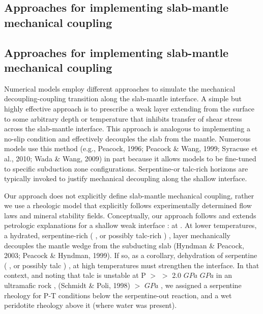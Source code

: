 \documentclass[draft,linenumbers]{agujournal2018} %
\providecommand{\DIFaddtex}[1]{{\protect\color{blue} \sf #1}} %
\providecommand{\DIFdeltex}[1]{{\protect\color{red} \scriptsize #1}} %
\providecommand{\DIFaddbegin}{} %
\providecommand{\DIFaddend}{} %
\providecommand{\DIFdelbegin}{} %
\providecommand{\DIFdelend}{} %
\providecommand{\DIFadd}[1]{\texorpdfstring{\DIFaddtex{#1}}{#1}} %
\providecommand{\DIFdel}[1]{\texorpdfstring{\DIFdeltex{#1}}{}} %
\newcommand{\DIFscaledelfig}{0.3}
\newlength{\DIFdelgraphicswidth} %
\newlength{\DIFdelgraphicsheight} %
\newcommand{\DIFaddincludegraphics}[2][]{{\color{blue}\fbox{\DIFOincludegraphics[#1]{#2}}}} %
\newcommand{\DIFdelincludegraphics}[2][]{%
\sbox{\DIFdelgraphicsbox}{\DIFOincludegraphics[#1]{#2}}%
\settoboxwidth{\DIFdelgraphicswidth}{\DIFdelgraphicsbox} %
\settoboxtotalheight{\DIFdelgraphicsheight}{\DIFdelgraphicsbox} %
\scalebox{\DIFscaledelfig}{%
\parbox[b]{\DIFdelgraphicswidth}{\usebox{\DIFdelgraphicsbox}\\[-\baselineskip] \rule{\DIFdelgraphicswidth}{0em}}\llap{\resizebox{\DIFdelgraphicswidth}{\DIFdelgraphicsheight}{%
\setlength{\unitlength}{\DIFdelgraphicswidth}%
\begin{picture}(1,1)%
\thicklines\linethickness{2pt} %
{\color[rgb]{1,0,0}\put(0,0){\framebox(1,1){}}}%
{\color[rgb]{1,0,0}\put(0,0){\line( 1,1){1}}}%
{\color[rgb]{1,0,0}\put(0,1){\line(1,-1){1}}}%
\end{picture}%
}\hspace*{3pt}}} %
} %
\DeclareRobustCommand{\DIFaddbegin}{\DIFOaddbegin \let\includegraphics\DIFaddincludegraphics} %
\DeclareRobustCommand{\DIFaddend}{\DIFOaddend \let\includegraphics\DIFOincludegraphics} %
\DeclareRobustCommand{\DIFdelbegin}{\DIFOdelbegin \let\includegraphics\DIFdelincludegraphics} %
\DeclareRobustCommand{\DIFdelend}{\DIFOaddend \let\includegraphics\DIFOincludegraphics} %
\begin{document}
\DIFdelbegin \subsection*{\DIFdel{Approaches for implementing slab-mantle mechanical coupling}}
\DIFdelend \DIFaddbegin \subsection{\DIFadd{Approaches for implementing slab-mantle mechanical coupling}}

\DIFaddend Numerical models employ different approaches to simulate the mechanical
decoupling-coupling transition along the slab-mantle interface. A simple
but highly effective approach is to prescribe a weak layer extending
from the surface to some arbitrary depth or temperature that inhibits
transfer of shear stress across the slab-mantle interface. This approach
is analogous to implementing a no-slip condition and effectively
decouples the slab from the mantle. Numerous models use this method
\DIFdelbegin %
\DIFdelend \DIFaddbegin \DIFadd{(e.g., Peacock, 1996; Peacock \& Wang, 1999; Syracuse et al., 2010; Wada
\& Wang, 2009) }\DIFaddend in part because it allows models to be fine-tuned to
specific subduction zone configurations. Serpentine-or talc-rich
horizons are typically invoked to justify mechanical decoupling along
the shallow interface.

Our approach does not explicitly define slab-mantle mechanical coupling,
rather we use a rheologic model that explicitly follows experimentally
determined flow laws and mineral stability fields. Conceptually, our
approach follows and extends petrologic explanations for a shallow weak
interface\DIFdelbegin \DIFdel{: at }\DIFdelend \DIFaddbegin \DIFadd{. At }\DIFaddend lower temperatures, a hydrated, serpentine-rich\DIFdelbegin \DIFdel{(}\DIFdelend \DIFaddbegin \DIFadd{, }\DIFaddend or
possibly talc-rich\DIFdelbegin \DIFdel{) }\DIFdelend \DIFaddbegin \DIFadd{, }\DIFaddend layer mechanically decouples the mantle wedge from
the subducting slab \DIFdelbegin %
\DIFdelend \DIFaddbegin \DIFadd{(Hyndman \& Peacock, 2003; Peacock \& Hyndman,
1999)}\DIFaddend . If so, as a corollary, dehydration of serpentine\DIFdelbegin \DIFdel{(}\DIFdelend \DIFaddbegin \DIFadd{, }\DIFaddend or possibly
talc\DIFdelbegin \DIFdel{) }\DIFdelend \DIFaddbegin \DIFadd{, }\DIFaddend at high temperatures must strengthen the interface. In that
context, and noting that talc is unstable at P \DIFdelbegin \DIFdel{$>$ }\DIFdelend \DIFaddbegin \DIFadd{\(>\) }\DIFaddend 2.0 \DIFdelbegin \DIFdel{$GPa$ }\DIFdelend \DIFaddbegin \DIFadd{\(GPa\) }\DIFaddend in an
ultramafic rock \DIFdelbegin %
\DIFdel{, }\DIFdelend \DIFaddbegin \DIFadd{(Schmidt \& Poli, 1998) \(>\) \(GPa\) , }\DIFaddend we assigned a
serpentine rheology for P-T conditions below the serpentine-out
reaction, and a wet peridotite rheology above it\DIFdelbegin \DIFdel{(where water was present)}\DIFdelend .
\end{document}
